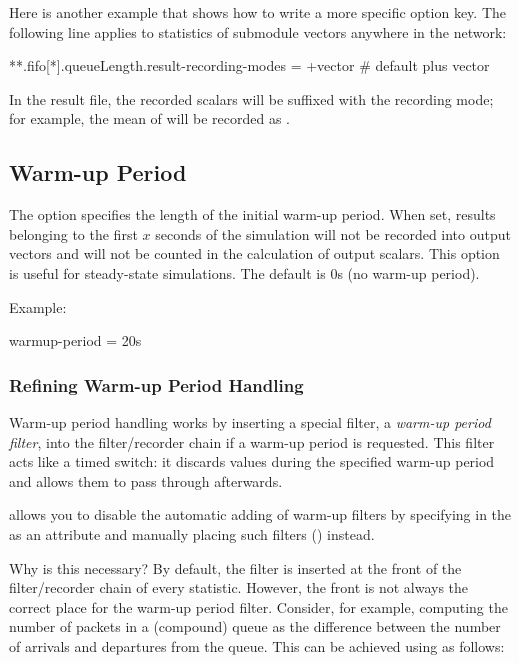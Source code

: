 Here is another example that shows how to write a more specific option key. The
following line applies to  statistics of  submodule
vectors anywhere in the network:

\begin{inifile}
**.fifo[*].queueLength.result-recording-modes = +vector  # default plus vector
\end{inifile}

In the result file, the recorded scalars will be suffixed with the recording
mode; for example, the mean of  will be recorded as
.

\subsection{Warm-up Period}
\label{sec:ana-sim:warmup-period}

The  option specifies the length of the initial warm-up
period. When set, results belonging to the first $x$ seconds of the simulation
will not be recorded into output vectors and will not be counted in the
calculation of output scalars. This option is useful for steady-state
simulations. The default is 0s (no warm-up period).

Example:

\begin{inifile}
warmup-period = 20s
\end{inifile}


\subsubsection{Refining Warm-up Period Handling}
\label{sec:ana-sim:refining-warmup-period-handling}

Warm-up period handling works by inserting a special filter, a \textit{warm-up
period filter}, into the filter/recorder chain if a warm-up period is requested.
This filter acts like a timed switch: it discards values during the specified
warm-up period and allows them to pass through afterwards.

{\opp} allows you to disable the automatic adding of warm-up filters by
specifying  in the  as an attribute
and manually placing such filters () instead.

Why is this necessary? By default, the filter is inserted at the front of the
filter/recorder chain of every statistic. However, the front is not always the
correct place for the warm-up period filter. Consider, for example, computing
the number of packets in a (compound) queue as the difference between the number
of arrivals and departures from the queue. This can be achieved using
 as follows:

